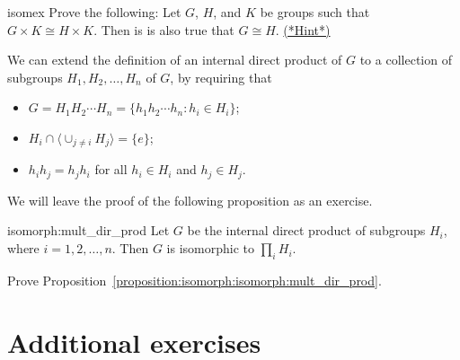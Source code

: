 \begin{exercise}{isomex}
Prove the following: Let $G$, $H$, and $K$ be
groups such that $G \times K \cong H \times K$. Then is is also true that $G \cong H$. 
\hyperref[sec:isomorph:hints]{(*Hint*)}
\end{exercise}

We can extend the definition of an internal direct product of $G$ to a
collection of subgroups $H_1, H_2, \ldots, H_n$ of $G$, by requiring
that 
\begin{itemize}
 
\item
$G = H_1 H_2 \cdots H_n = \{ h_1 h_2 \cdots h_n : h_i \in H_i \}$;
 
\item
$H_i \cap \langle \cup_{j \neq i} H_j \rangle = \{ e \}$;
 
\item
$h_i h_j = h_j h_i$ for all $h_i \in H_i$ and $h_j \in H_j$.
 
\end{itemize}
We will leave the proof of the following proposition as an exercise. 
 
\begin{prop}{isomorph:mult_dir_prod}
Let $G$ be the internal direct product of subgroups $H_i$, where $i =
1, 2, \ldots, n$. Then $G$ is isomorphic to $\prod_i H_i$. 
\end{prop}

\begin{exercise}{}
Prove Proposition~\ref{proposition:isomorph:isomorph:mult_dir_prod}.
\end{exercise}
 


 
\section*{Additional exercises}
\label{sec:AdditionalExercises}
\exrule

 
 
